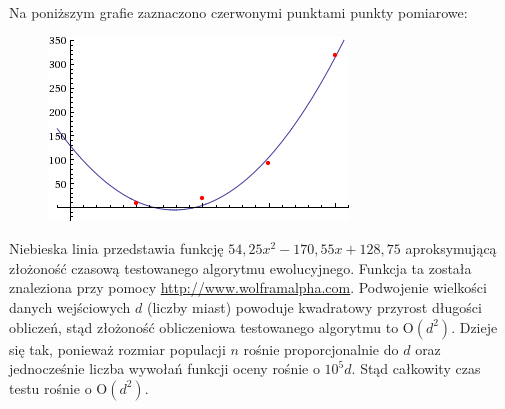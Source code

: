 \documentclass[12pt, a4paper]{article}
\begin{document}
Na poniższym grafie zaznaczono czerwonymi punktami punkty pomiarowe:

\begin{figure}[H]
\centering
  \includegraphics[width=.5\textwidth]{time.png}
\end{figure}

Niebieska linia przedstawia funkcję $54,25x^2 - 170,55x + 128,75$ aproksymującą
złożoność czasową testowanego algorytmu ewolucyjnego. Funkcja ta została znaleziona przy pomocy
\url{http://www.wolframalpha.com}. Podwojenie wielkości danych wejściowych $d$ (liczby miast) powoduje
kwadratowy przyrost długości obliczeń, stąd złożoność obliczeniowa 
testowanego algorytmu to O$(d^2)$. Dzieje się tak, ponieważ rozmiar populacji $n$ rośnie
proporcjonalnie do $d$ oraz jednocześnie liczba wywołań funkcji oceny rośnie o $10^5d$.
Stąd całkowity czas testu rośnie o O$(d^2)$.
\end{document}
